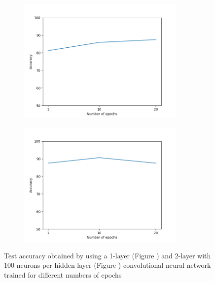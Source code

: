 \documentclass[12pt]{article}
\begin{document}
\begin{figure}[h]
		\begin{subfigure}{0.6\textwidth}
		\includegraphics[width = 0.9\textwidth]{ex3_CNN1l_accuracy-epochs.png}
		\caption{}
		\label{subfig:CNN1l_accuracy-epochs}
	\end{subfigure}
	\begin{subfigure}{0.6\textwidth}
		\includegraphics[width = 0.9\textwidth]{ex3_CNN2l_accuracy-epochs.png}
		\caption{}
		\label{subfig:CNN2l_accuracy-epochs}
	\end{subfigure}
	\caption{Test accuracy obtained by using a 1-layer (Figure ) and 2-layer with 100 neurons per hidden layer (Figure ) convolutional neural network trained for different numbers of epochs}
	\label{fig:ex3_CNN_epochs}
\end{figure}
\end{document}
